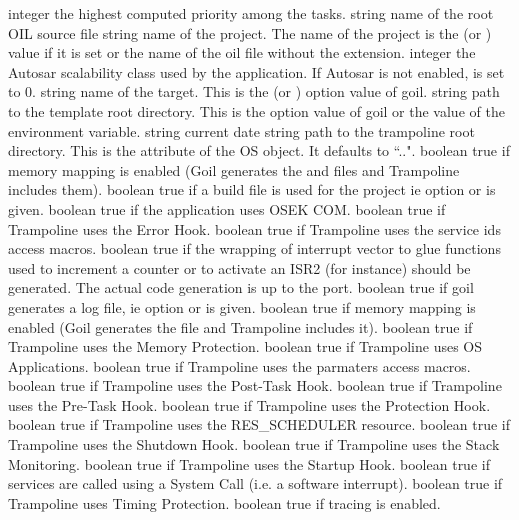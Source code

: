 {integer}
{the highest computed priority among the tasks.} 
{string}
{name of the root OIL source file} 
{string}
{name of the project. The name of the project is the  (or ) value if it is set or the name of the oil file without the extension.} 
{integer}
{the Autosar scalability class used by the application. If Autosar is not enabled,  is set to 0.} 
{string}
{name of the target. This is the  (or ) option value of goil.} 
{string}
{path to the template root directory. This is the  option value of goil or the value of the  environment variable.} 
{string}
{current date} 
{string}
{path to the trampoline root directory. This is the  attribute of the OS object. It defaults to ``..".} 
{boolean}
{true if memory mapping is enabled (Goil generates the  and  files and Trampoline includes them).} 
{boolean}
{true if a build file is used for the project ie option  or  is given.} 
{boolean}
{true if the application uses OSEK COM.} 
{boolean}
{true if Trampoline uses the Error Hook.} 
{boolean}
{true if Trampoline uses the service ids access macros.} 
{boolean}
{true if the wrapping of interrupt vector to glue functions used to increment a counter or to activate an ISR2 (for instance) should be generated. The actual code generation is up to the port.} 
{boolean}
{true if goil generates a log file, ie option  or  is given.}
{boolean}
{true if memory mapping is enabled (Goil generates the  file and Trampoline includes it).} 
{boolean}
{true if Trampoline uses the Memory Protection.} 
{boolean}
{true if Trampoline uses OS Applications.} 
{boolean}
{true if Trampoline uses the parmaters access macros.} 
{boolean}
{true if Trampoline uses the Post-Task Hook.} 
{boolean}
{true if Trampoline uses the Pre-Task Hook.} 
{boolean}
{true if Trampoline uses the Protection Hook.} 
{boolean}
{true if Trampoline uses the RES_SCHEDULER resource.} 
{boolean}
{true if Trampoline uses the Shutdown Hook.} 
{boolean}
{true if Trampoline uses the Stack Monitoring.} 
{boolean}
{true if Trampoline uses the Startup Hook.} 
{boolean}
{true if services are called using a System Call (i.e. a software interrupt).} 
{boolean}
{true if Trampoline uses Timing Protection.} 
{boolean}
{true if tracing is enabled.} 
